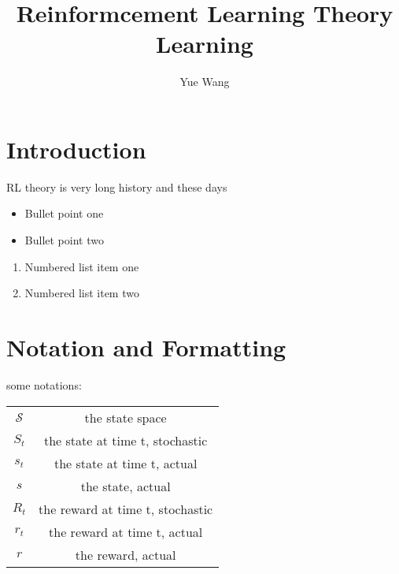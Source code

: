 \documentclass{article}
\title{Reinformcement Learning Theory Learning}
\author{Yue Wang}
\theoremstyle{definition}
\theoremstyle{remark}
\begin{document}
	\maketitle
	
	
	\section{Introduction}
	\label{introduction}
	
	RL theory is very long history and these days
	
	\begin{itemize}
		\item Bullet point one
		\item Bullet point two
	\end{itemize}
	
	\begin{enumerate}
		\item Numbered list item one
		\item Numbered list item two
	\end{enumerate}
	
	\section{Notation and Formatting}
	\label{notation}
	some notations: 
	
	\begin{center}
		\begin{tabular}{ |c  c| } 
			\hline
			$ \mathcal{S} $ &    the state space \\ 
			$ S_t $ &    the state at time t, stochastic  \\ 
			$ s_t $ &    the state at time t, actual  \\ 
			$ s $ & the state, actual\\
			
			
			$ R_t $ & the reward at time t, stochastic\\ 
			$ r_t $ & the reward at time t, actual\\
			$ r $ & the reward, actual\\
			
			
			
			
			
			\hline
		\end{tabular}
	\end{center}
	
	
	
\end{document}
